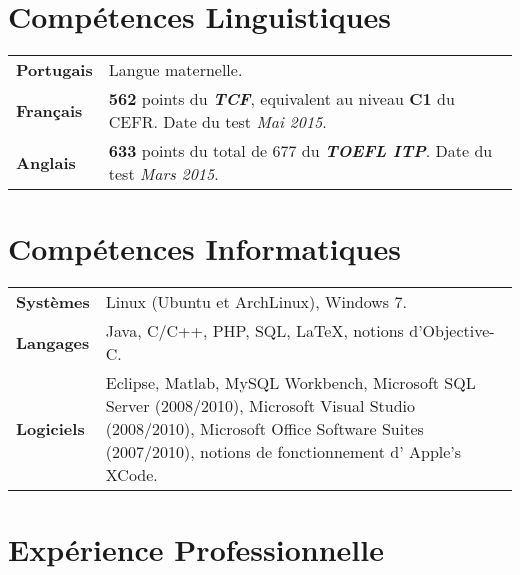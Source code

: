 \documentclass[10pt, a4paper]{article}
\begin{document}



\section{Compétences Linguistiques}

\begin{tabular}{p{} p{}}

\textbf{Portugais} & Langue maternelle.  \\ 

\textbf{Français} & \textbf{562} points du \textbf{\textit{TCF}},
equivalent au niveau \textbf{C1} du CEFR. Date du test \textit{Mai
2015}.\\

\textbf{Anglais} & \textbf{633} points du total de 677 du \textbf{\textit{TOEFL
ITP}}. Date du test \textit{Mars 2015}. \\  

\end{tabular}


\section{Compétences Informatiques} 

\begin{tabular}{p{} p{}}

 \textbf{Systèmes} & Linux (Ubuntu et ArchLinux), Windows 7.  \\ 

 \textbf{Langages} & Java, C/C++, PHP,  SQL, \LaTeX, notions d’Objective-C. \\ 
 
 \textbf{Logiciels} & Eclipse, Matlab, MySQL Workbench,  Microsoft SQL Server
 (2008/2010), Microsoft Visual Studio (2008/2010),  Microsoft Office Software
 Suites (2007/2010), notions de fonctionnement d’ Apple’s XCode. \\
\end{tabular}


\section{Expérience Professionnelle}
\end{document}
